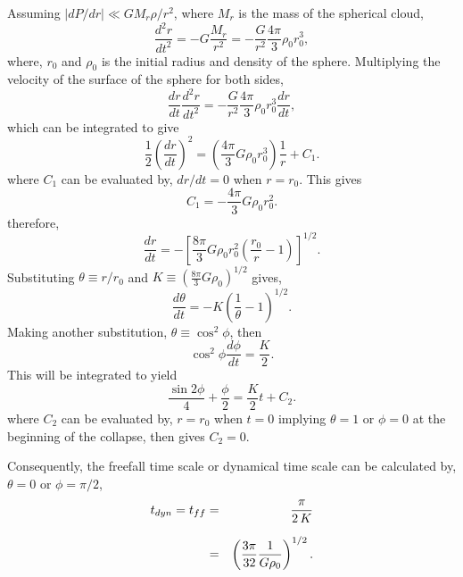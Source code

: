 Assuming $|dP/dr| \ll G M_{r}\rho/r^{2}$, where $M_{r}$ is the mass of the spherical cloud,
\begin{equation}
   \frac{d^2 r}{dt^{2}} = -G \frac{M_{r}}{r^{2}} = -\frac{G}{r^{2}} \frac{4\pi}{3} \rho_{0} r_{0}^{3}, 
\end{equation}
where, $r_{0}$ and $\rho_{0}$ is the initial radius and density of the sphere. Multiplying the velocity 
of the surface  of the sphere for both sides,
\begin{equation}
   \frac{dr}{dt}\frac{d^2 r}{dt^{2}} = -\frac{G}{r^{2}} \frac{4\pi}{3} \rho_{0} r_{0}^{3} \frac{dr}{dt},
\end{equation}
which can be integrated to give
\begin{equation}
   \frac{1}{2}\left( \frac{dr}{dt} \right)^{2} = \left( \frac{4\pi}{3}G\rho_{0}r_{0}^{3} \right)\frac{1}{r} + C_{1}.
\end{equation}
where $C_{1}$ can be evaluated by, $dr/dt=0$ when $r=r_{0}$. This gives
\begin{equation}
   C_{1} = -\frac{4\pi}{3} G \rho_{0} r_{0}^2.
\end{equation}
therefore,
\begin{equation}
   \frac{dr}{dt} = - \left[ \frac{8\pi}{3}G \rho_{0} r_{0}^{2} \left( \frac{r_{0}}{r} -1 \right) \right]^{1/2}.
\end{equation}
Substituting $\theta \equiv r/r_{0}$ and $K \equiv \left( \frac{8\pi}{3} G \rho_{0} \right)^{1/2}$ gives,
\begin{equation}
   \frac{d\theta}{dt} = - K \left( \frac{1}{\theta} -1 \right)^{1/2}.
\end{equation}
Making another substitution, $\theta \equiv \cos^2{\phi}$, then
\begin{equation}
   \cos^{2}{\phi} \frac{d\phi}{dt} = \frac{K}{2}.
\end{equation}
This will be integrated to yield
\begin{equation}
   \frac{\sin{2\phi}}{4} + \frac{\phi}{2} = \frac{K}{2}t + C_{2}.
\end{equation}
where $C_{2}$ can be evaluated by, $r=r_{0}$ when $t=0$ implying $\theta=1$ or $\phi=0$ at the beginning of the collapse,
then gives $C_{2}=0$.

Consequently, the freefall time scale or dynamical time scale can be calculated by, $\theta=0$ or $\phi = \pi/2$,
\begin{eqnarray}\label{eq:fftime}
   t_{dyn} = t_{ff} &=& \frac{\pi}{2\,K} \nonumnext
                    &=& \left( \frac{3\pi}{32} \frac{1}{G \rho_{0}}\right)^{1/2}.
\end{eqnarray}

